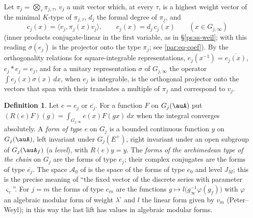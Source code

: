 \documentclass[10pt]{amsart}
\theoremstyle{definition}
\newtheorem{definition}[theorem]{Definition}
\theoremstyle{remark}
\providecommand{\auAz}{\mathcal A_0}
\begin{document}
Let $\pi_j=\bigotimes_\tau\pi_{j,\tau}$, $v_j$ a unit vector which, at every $\tau$, is a highest
weight vector of the minimal $K$-type of $\pi_{j,\tau}$, $d_j$ the formal degree of $\pi_j$, and
\[
c_j(x)=\langle v_j,\pi_j(x)v_j\rangle,\qquad e_j(x)=d_j\,\overline{c_j(x)}\qquad(x\in G_{j,\infty})
\]
(inner products conjugate-linear in the first variable, as in \S\ref{ps:ss-weil}; with this reading $\sigma(e_j)$ is the projector onto the type $\pi_j$; see \eqref{par:eq-coef}).
By the orthogonality relations for square-integrable representations, $e_j(x^{-1})=
\overline{e_j(x)}$, $e_j*e_j=e_j$, and for a unitary representation $\sigma$ of $G_{j,\infty}$ the
operator $\int e_j(x)\sigma(x)\,dx$, when $e_j$ is integrable, is the orthogonal projector onto
the vectors that span with their translates a multiple of $\pi_j$ and correspond to $v_j$.

\begin{definition}\label{pz:def-type}
Let $e=e_j$ or $\overline{e_j}$. For a function $F$ on $G_j(\auA)$ put $(R(e)F)(g)=
\int_{G_{j,\infty}}e(x)F(gx)\,dx$ when the integral converges absolutely. A \emph{form of type $e$}
on $G_j$ is a bounded continuous function $y$ on $G_j(\auA)$, left invariant under $G_j(E^+)$, right
invariant under an open subgroup of $G_j(\auA_f)$ (a \emph{level}), with $R(e)y=y$. The
\emph{forms of the archimedean type of the chain} on $G_j$ are the forms of type $e_j$; their
complex conjugates are the forms of type $\overline{e_j}$. The space $\auAz$ of
{\cite[\S14.3]{P46}} is the space of the forms of type $e_0$ and level $J_M$; this is the precise
meaning of ``the fixed vector of the discrete series with parameter $\varsigma_\tau$''. For $j=m$
the forms of type $e_m$ are the functions $g\mapsto l\bigl(g_\infty^{-1}\varphi(g_f)\bigr)$ with
$\varphi$ an algebraic modular form of weight $\lambda^\circ$ and $l$ the linear form given by
$v_m$ (Peter--Weyl); in this way the last lift has values in algebraic modular forms.
\end{definition}
\end{document}
